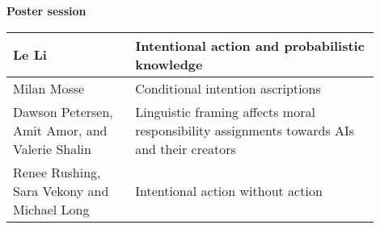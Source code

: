 \documentclass[11pt]{article}
\begin{document}
\vspace{2cm}

\textbf{Poster session\\[5pt]			}				

\begin{tabular}{ p{0.3\linewidth} p{0.6\linewidth}}
Le Li 
& Intentional action and probabilistic knowledge \\
\hline
Milan Mosse
& Conditional intention ascriptions \\
\hline
Dawson Petersen, Amit Amor, and Valerie Shalin
& Linguistic framing affects moral responsibility assignments towards AIs and their creators \\
\hline
Renee Rushing, Sara Vekony and Michael Long
& Intentional action without action \\
\end{tabular}
\end{document}

